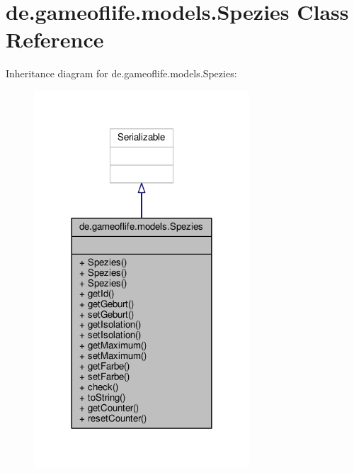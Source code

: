 \hypertarget{classde_1_1gameoflife_1_1models_1_1Spezies}{\section{de.\-gameoflife.\-models.\-Spezies Class Reference}
\label{classde_1_1gameoflife_1_1models_1_1Spezies}
}


Inheritance diagram for de.\-gameoflife.\-models.\-Spezies\-:\nopagebreak
\begin{figure}[H]
\begin{center}
\leavevmode
\includegraphics[width=228pt]{classde_1_1gameoflife_1_1models_1_1Spezies__inherit__graph}
\end{center}
\end{figure}


